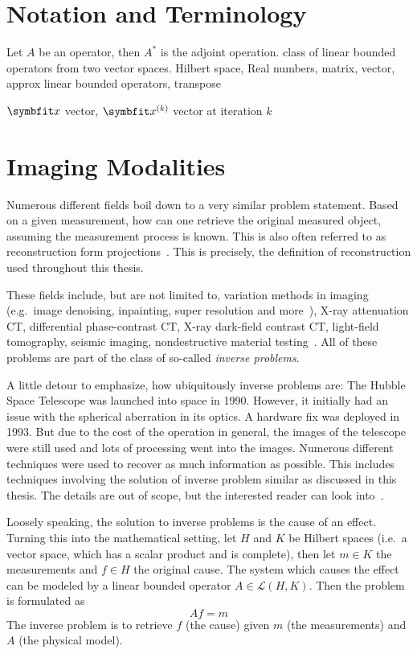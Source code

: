 \chapter{Notation and Terminology}\label{chap:notation}

Let \(A\) be an operator, then \(A^\ast\) is the adjoint operation. class of linear bounded
operators from two vector spaces.
Hilbert space, Real numbers, matrix, vector, approx linear bounded operators, transpose

\(\mvec{x}\) vector, \(\mvec{x}^{(k)}\) vector at iteration \(k\)

\chapter{Imaging Modalities}\label{chap:imaging_modalities}

Numerous different fields boil down to a very similar problem statement. Based on a given
measurement, how can one retrieve the original measured object, assuming the measurement process is
known. This is also often referred to as reconstruction form projections~\cite{herman_basis_2015}.
This is precisely, the definition of reconstruction used throughout this thesis.

These fields include, but are not limited to, variation methods in imaging (e.g.\ image denoising,
inpainting, super resolution and more~\cite{scherzer_variational_2009}), X-ray attenuation CT,
differential phase-contrast CT, X-ray dark-field contrast CT, light-field tomography, seismic
imaging, nondestructive material testing~\cite{carpio_inverse_2008}. All of these problems are part
of the class of so-called \textit{inverse problems}.

A little detour to emphasize, how ubiquitously inverse problems are: The Hubble Space Telescope was
launched into space in 1990. However, it initially had an issue with the spherical aberration in its
optics. A hardware fix was deployed in 1993. But due to the cost of the operation in general, the
images of the telescope were still used and lots of processing went into the images. Numerous
different techniques were used to recover as much information as possible. This includes techniques
involving the solution of inverse problem similar as discussed in this thesis. The details are out
of scope, but the interested reader can look into~\cite{white_restoration_1992,adorf_hubble_1995}.

\begin{definition}\label{def:inverse_problem}
	Loosely speaking, the solution to inverse problems is the cause of an effect. Turning this
	into the mathematical setting, let \(H\) and \(K\) be Hilbert spaces (i.e.\ a vector space,
	which has a scalar product and is complete), then let \(m \in K\) the measurements and \(f
	\in H\) the original cause. The system which causes the effect can be modeled by a
	linear bounded operator \(A \in \mathscr{L}(H, K)\). Then the problem is formulated as
	\[ A f = m \]
	The inverse problem is to retrieve \(f\) (the cause) given \(m\) (the measurements) and \(A\)
	(the physical model).
\end{definition}

